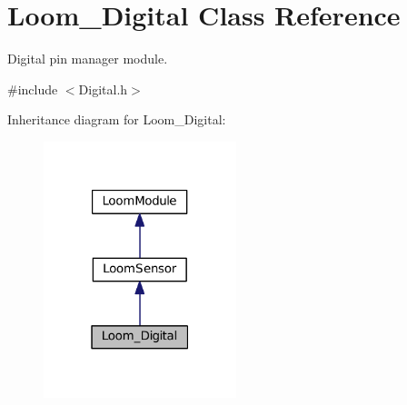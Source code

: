 \hypertarget{class_loom___digital}{}\section{Loom\+\_\+\+Digital Class Reference}
\label{class_loom___digital}


Digital pin manager module.  




{\ttfamily \#include $<$Digital.\+h$>$}



Inheritance diagram for Loom\+\_\+\+Digital\+:\nopagebreak
\begin{figure}[H]
\begin{center}
\leavevmode
\includegraphics[width=159pt]{class_loom___digital__inherit__graph}
\end{center}
\end{figure}
